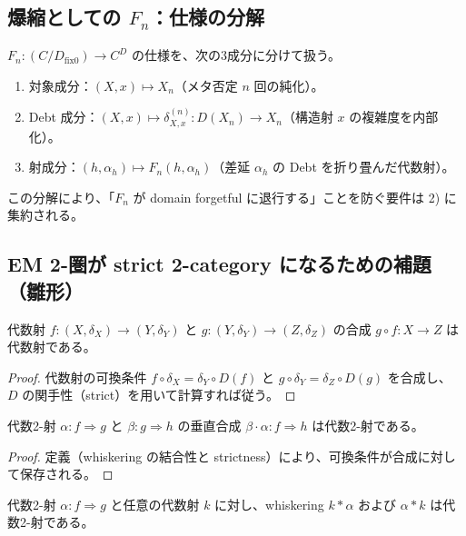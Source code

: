 \documentclass[a4paper,11pt]{article}
\begin{document}
\subsection{爆縮としての \texorpdfstring{$F_n$}{Fn}：仕様の分解}
\begin{definition}
$F_n:(C/D_{\mathrm{fix}0})\to C^D$ の仕様を、次の3成分に分けて扱う。
\begin{enumerate}
  \item 対象成分：$(X,x)\mapsto X_n$（メタ否定 $n$ 回の純化）。
  \item Debt 成分：$(X,x)\mapsto \delta_{X,x}^{(n)}:D(X_n)\to X_n$（構造射 $x$ の複雑度を内部化）。
  \item 射成分：$(h,\alpha_h)\mapsto F_n(h,\alpha_h)$（差延 $\alpha_h$ の Debt を折り畳んだ代数射）。
\end{enumerate}
\end{definition}

\begin{remark}
この分解により、「$F_n$ が domain forgetful に退行する」ことを防ぐ要件は 2) に集約される。
\end{remark}

\subsection{EM 2-圏が strict 2-category になるための補題（雛形）}
\begin{lemma}[代数射の合成の閉性（雛形）]
代数射 $f:(X,\delta_X)\to(Y,\delta_Y)$ と $g:(Y,\delta_Y)\to(Z,\delta_Z)$ の合成 $g\circ f:X\to Z$ は代数射である。
\end{lemma}

\begin{proof}
代数射の可換条件 $f\circ \delta_X=\delta_Y\circ D(f)$ と $g\circ \delta_Y=\delta_Z\circ D(g)$ を合成し、
$D$ の関手性（strict）を用いて計算すれば従う。
\end{proof}

\begin{lemma}[代数2-射の垂直合成の閉性（雛形）]
代数2-射 $\alpha:f\Rightarrow g$ と $\beta:g\Rightarrow h$ の垂直合成 $\beta\cdot\alpha:f\Rightarrow h$ は代数2-射である。
\end{lemma}

\begin{proof}
定義（whiskering の結合性と strictness）により、可換条件が合成に対して保存される。
\end{proof}

\begin{lemma}
代数2-射 $\alpha:f\Rightarrow g$ と任意の代数射 $k$ に対し、whiskering $k*\alpha$ および $\alpha*k$ は代数2-射である。
\end{lemma}
\end{document}
